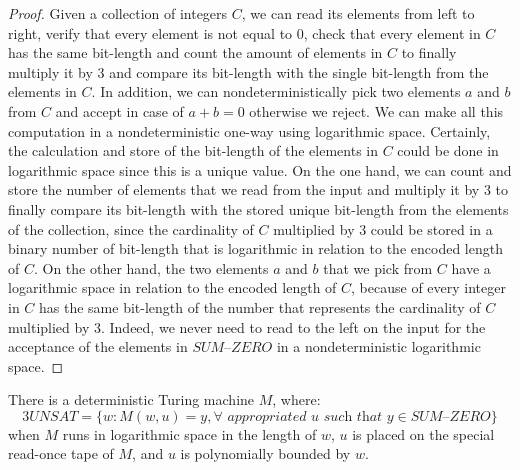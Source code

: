 \documentclass[a4paper,UKenglish,cleveref, autoref]{lipics-v2019}
\begin{document}
\begin{proof}
Given a collection of integers $C$, we can read its elements from left to right, verify that every element is not equal to $0$, check that every element in $C$ has the same bit-length and count the amount of elements in $C$ to finally multiply it by $3$ and compare its bit-length with the single bit-length from the elements in $C$. In addition, we can nondeterministically pick two elements $a$ and $b$ from $C$ and accept in case of $a + b = 0$ otherwise we reject. We can make all this computation in a nondeterministic one-way using logarithmic space. Certainly, the calculation and store of the bit-length of the elements in $C$ could be done in logarithmic space since this is a unique value. On the one hand, we can count and store the number of elements that we read from the input and multiply it by $3$ to finally compare its bit-length with the stored unique bit-length from the elements of the collection, since the cardinality of $C$ multiplied by $3$ could be stored in a binary number of bit-length that is logarithmic in relation to the encoded length of $C$. On the other hand, the two elements $a$ and $b$ that we pick from $C$ have a logarithmic space in relation to the encoded length of $C$, because of every integer in $C$ has the same bit-length of the number that represents the cardinality of $C$ multiplied by $3$. Indeed, we never need to read to the left on the input for the acceptance of the elements in $\textit{SUM--ZERO}$ in a nondeterministic logarithmic space.
\end{proof}

\begin{theorem}
\label{demonstration}
There is a deterministic Turing machine $M$, where:
\[3UNSAT = \{w: M(w, u) = y, \forall \textit{ appropriated } u \textit{ such that } y \in \textit{SUM--ZERO}\}\]
when $M$ runs in logarithmic space in the length of $w$, $u$ is placed on the special read-once tape of $M$, and $u$ is polynomially bounded by $w$.
\end{theorem}
\end{document}
